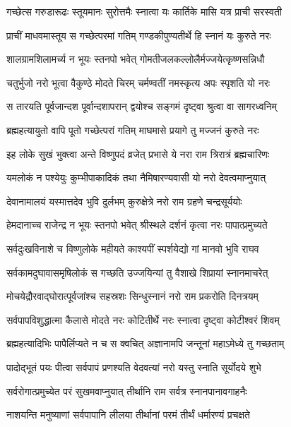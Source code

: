 \twolineshloka
{गच्छेत्स गरुडारूढः स्तूयमानः सुरोत्तमैः}
{स्नात्वा यः कार्तिके मासि यत्र प्राची सरस्वती}%

\twolineshloka
{प्राचीं माधवमास्तूय स गच्छेत्परमां गतिम्}
{गण्डकीपुण्यतीर्थे हि स्नानं यः कुरुते नरः}%

\twolineshloka
{शालग्रामशिलामर्च्य न भूयः स्तनपो भवेत्}
{गोमतीजलकल्लोलैर्मज्जयेत्कृष्णसन्निधौ}%

\twolineshloka
{चतुर्भुजो नरो भूत्वा वैकुण्ठे मोदते चिरम्}
{चर्मण्वतीं नमस्कृत्य अपः स्पृशति यो नरः}%

\twolineshloka
{स तारयति पूर्वजान्दश पूर्वान्दशापरान्}
{द्वयोश्च सङ्गमं दृष्ट्वा श्रुत्वा वा सागरध्वनिम्}%

\twolineshloka
{ब्रह्महत्यायुतो वापि पूतो गच्छेत्परां गतिम्}
{माघमासे प्रयागे तु मज्जनं कुरुते नरः}%

\twolineshloka
{इह लोके सुखं भुक्त्वा अन्ते विष्णुपदं व्रजेत्}
{प्रभासे ये नरा राम त्रिरात्रं ब्रह्मचारिणः}%

\twolineshloka
{यमलोकं न पश्येयुः कुम्भीपाकादिकं तथा}
{नैमिषारण्यवासी यो नरो देवत्वमाप्नुयात्}%

\twolineshloka
{देवानामालयं यस्मात्तदेव भुवि दुर्लभम्}
{कुरुक्षेत्रे नरो राम ग्रहणे चन्द्रसूर्ययोः}%

\twolineshloka
{हेमदानाच्च राजेन्द्र न भूयः स्तनपो भवेत्}
{श्रीस्थले दर्शनं कृत्वा नरः पापात्प्रमुच्यते}%

\twolineshloka
{सर्वदुःखविनाशे च विष्णुलोके महीयते}
{काश्यपीं स्पर्शयेद्यो गां मानवो भुवि राघव}%

\twolineshloka
{सर्वकामदुघावासमृषिलोकं स गच्छति}
{उज्जयिन्यां तु वैशाखे शिप्रायां स्नानमाचरेत्}%

\twolineshloka
{मोचयेद्रौरवाद्घोरात्पूर्वजांश्च सहस्रशः}
{सिन्धुस्नानं नरो राम प्रकरोति दिनत्रयम्}%

\twolineshloka
{सर्वपापविशुद्धात्मा कैलासे मोदते नरः}
{कोटितीर्थे नरः स्नात्वा दृष्ट्वा कोटीश्वरं शिवम्}%

\twolineshloka
{ब्रह्महत्यादिभिः पापैर्लिप्यते न च स क्वचित्}
{अज्ञानामपि जन्तूनां महाऽमेध्ये तु गच्छताम्}%

\twolineshloka
{पादोद्भूतं पयः पीत्वा सर्वपापं प्रणश्यति}
{वेदवत्यां नरो यस्तु स्नाति सूर्योदये शुभे}%

\twolineshloka
{सर्वरोगात्प्रमुच्येत परं सुखमवाप्नुयात्}
{तीर्थानि राम सर्वत्र स्नानपानावगाहनैः}%

\twolineshloka
{नाशयन्ति मनुष्याणां सर्वपापानि लीलया}
{तीर्थानां परमं तीर्थं धर्मारण्यं प्रचक्षते}%

